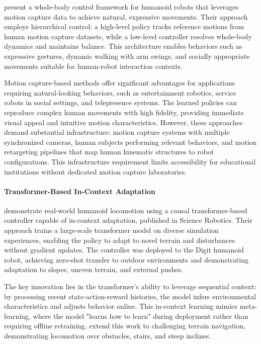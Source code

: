 \documentclass[12pt,a4paper]{article}
\begin{document}
\textcite{cheng2024expressive} present a whole-body control framework for humanoid robots that leverages motion capture data to achieve natural, expressive movements. Their approach employs hierarchical control: a high-level policy tracks reference motions from human motion capture datasets, while a low-level controller resolves whole-body dynamics and maintains balance. This architecture enables behaviors such as expressive gestures, dynamic walking with arm swings, and socially appropriate movements suitable for human-robot interaction contexts.

Motion capture-based methods offer significant advantages for applications requiring natural-looking behaviors, such as entertainment robotics, service robots in social settings, and telepresence systems. The learned policies can reproduce complex human movements with high fidelity, providing immediate visual appeal and intuitive motion characteristics. However, these approaches demand substantial infrastructure: motion capture systems with multiple synchronized cameras, human subjects performing relevant behaviors, and motion retargeting pipelines that map human kinematic structures to robot configurations. This infrastructure requirement limits accessibility for educational institutions without dedicated motion capture laboratories.

\paragraph{Transformer-Based In-Context Adaptation}

\textcite{radosavovic2024realworld} demonstrate real-world humanoid locomotion using a causal transformer-based controller capable of in-context adaptation, published in Science Robotics. Their approach trains a large-scale transformer model on diverse simulation experiences, enabling the policy to adapt to novel terrain and disturbances without gradient updates. The controller was deployed to the Digit humanoid robot, achieving zero-shot transfer to outdoor environments and demonstrating adaptation to slopes, uneven terrain, and external pushes.

The key innovation lies in the transformer's ability to leverage sequential context: by processing recent state-action-reward histories, the model infers environmental characteristics and adjusts behavior online. This in-context learning mimics meta-learning, where the model "learns how to learn" during deployment rather than requiring offline retraining. \textcite{radosavovic2024challenging} extend this work to challenging terrain navigation, demonstrating locomotion over obstacles, stairs, and steep inclines.
\end{document}
